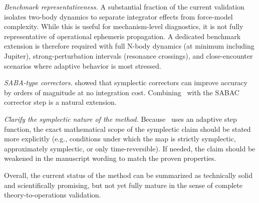 \textit{Benchmark representativeness.} A substantial fraction of the
current validation isolates two-body dynamics to separate integrator
effects from force-model complexity. While this is useful for
mechanism-level diagnostics, it is not fully representative of
operational ephemeris propagation. A dedicated benchmark extension is
therefore required with full N-body dynamics (at minimum including
Jupiter), strong-perturbation intervals (resonance crossings), and
close-encounter scenarios where adaptive behavior is most stressed.

\textit{SABA-type correctors.} \citet{LaskarRobutel2001} showed
that symplectic correctors can improve accuracy by orders of
magnitude at no integration cost. Combining \AAS\ with the SABAC
corrector step is a natural extension.

\textit{Clarify the symplectic nature of the method.} Because
\AAS\ uses an adaptive step function, the exact mathematical
scope of the symplectic claim should be stated more explicitly
(e.g., conditions under which the map is strictly symplectic,
approximately symplectic, or only time-reversible). If needed,
the claim should be weakened in the manuscript wording to match
the proven properties.

Overall, the current status of the method can be summarized as
technically solid and scientifically promising, but not yet fully
mature in the sense of complete theory-to-operations validation.
